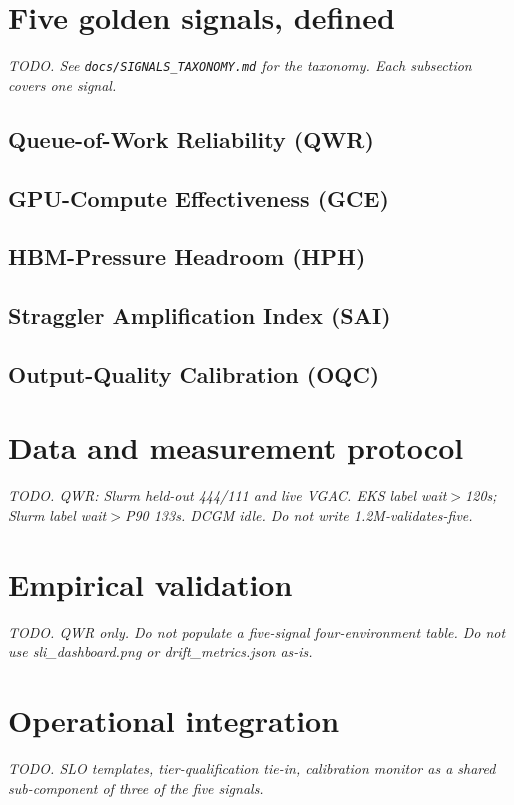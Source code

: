 \documentclass[11pt]{article}
\begin{document}
\section{Five golden signals, defined}\label{sec:signals}
\emph{TODO. See \texttt{docs/SIGNALS\_TAXONOMY.md} for the taxonomy.
Each subsection covers one signal.}

\subsection{Queue-of-Work Reliability (QWR)}\label{sec:qwr}
\subsection{GPU-Compute Effectiveness (GCE)}\label{sec:gce}
\subsection{HBM-Pressure Headroom (HPH)}\label{sec:hph}
\subsection{Straggler Amplification Index (SAI)}\label{sec:sai}
\subsection{Output-Quality Calibration (OQC)}\label{sec:oqc}

\section{Data and measurement protocol}\label{sec:data}
\emph{TODO. QWR: Slurm held-out 444/111 and live VGAC. EKS label wait$>$120s;
Slurm label wait$>$P90 133s. DCGM idle. Do not write 1.2M-validates-five.}

\section{Empirical validation}\label{sec:results}
\emph{TODO. QWR only. Do not populate a five-signal four-environment
table. Do not use sli\_dashboard.png or drift\_metrics.json as-is.}

\section{Operational integration}\label{sec:ops}
\emph{TODO. SLO templates, tier-qualification tie-in, calibration monitor
as a shared sub-component of three of the five signals.}
\end{document}

